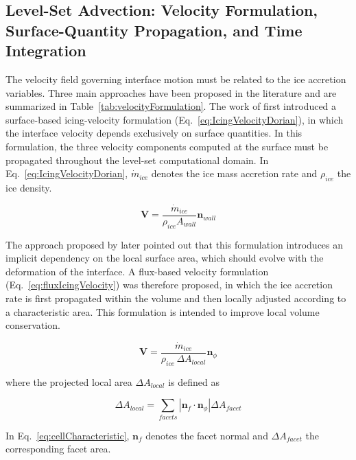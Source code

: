 \subsection{Level-Set Advection: Velocity Formulation, Surface-Quantity Propagation, and Time Integration}
\label{subsec:icing_velocity}

The velocity field governing interface motion must be related to the ice accretion variables. Three main approaches have been proposed in the literature and are summarized in Table~\ref{tab:velocityFormulation}. The work of \cite{PENA2016278} first introduced a surface-based icing-velocity formulation (Eq.~\ref{eq:IcingVelocityDorian}), in which the interface velocity depends exclusively on surface quantities. In this formulation, the three velocity components computed at the surface must be propagated throughout the level-set computational domain. In Eq.~\ref{eq:IcingVelocityDorian}, $\dot{m}_{ice}$ denotes the ice mass accretion rate and $\rho_{ice}$ the ice density.

\begin{equation}
\boldsymbol{V} = \frac{\dot{m}_{ice}}{\rho_{ice} A_{wall}} \boldsymbol{n}_{wall}
\label{eq:IcingVelocityDorian}
\end{equation}

The approach proposed by \cite{bourgault-coteMultilayerAirfoilIce2019} later pointed out that this formulation introduces an implicit dependency on the local surface area, which should evolve with the deformation of the interface. A flux-based velocity formulation (Eq.~\ref{eq:fluxIcingVelocity}) was therefore proposed, in which the ice accretion rate is first propagated within the volume and then locally adjusted according to a characteristic area. This formulation is intended to improve local volume conservation.

\begin{equation}
\boldsymbol{V} = \frac{\dot{m}_{ice}}{\rho_{ice} \, \Delta A_{local}} \boldsymbol{n}_{\phi}
\label{eq:fluxIcingVelocity}
\end{equation}

\noindent where the projected local area $\Delta A_{local}$ is defined as

\begin{equation}
\Delta A_{local} = \sum_{facets} 
\left| \boldsymbol{n}_f \cdot \boldsymbol{n}_{\phi} \right| \Delta A_{facet}
\label{eq:cellCharacteristic}
\end{equation}

\noindent In Eq.~\ref{eq:cellCharacteristic}, $\boldsymbol{n}_f$ denotes the facet normal and $\Delta A_{facet}$ the corresponding facet area.

